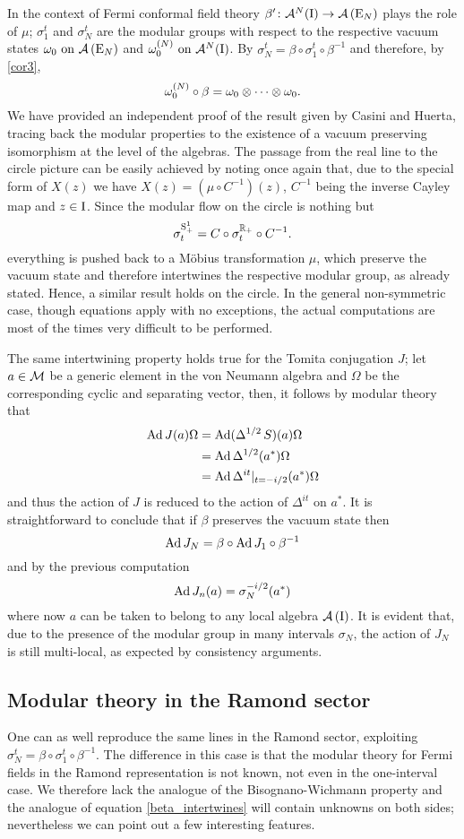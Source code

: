 In the context of Fermi conformal field theory 
$\beta'\colon\mathcal{A}^N(\textrm{I})\to \mathcal{A}\left(\textrm{E}_N\right)$ plays the role 
of $\mu$; $\sigma^t_1$ and $\sigma^t_N$ are the modular groups with 
respect to the respective vacuum states $\omega_0\text{ on }\mathcal{A}\left(\textrm{E}_N\right)$ 
and $\omega_0^{(N)}\text{ on } \mathcal{A}^N(\textrm{I})$.  By \cite*{CH:2009} 
$\sigma_N^t=\beta\circ\sigma^t_1\circ\beta^{-1}$ and therefore,
by \ref{cor3}, 
\[
\omega_0^{(N)}\circ\beta=\omega_0\otimes\cdots\otimes\omega_0.
\]
We have provided an independent proof of the result given 
by Casini and Huerta, tracing back the modular properties
to the existence of a vacuum preserving isomorphism at the 
level of the algebras. The passage from the real line to the 
circle picture can be easily achieved by noting once again 
that, due to the special form of $X(z)$ we have 
$X(z)=(\mu\circ C^{-1})(z)$, $C^{-1}$ being the inverse
Cayley map and $z\in\textrm{I}$. Since the modular flow on the circle is 
nothing but 
\[
\sigma_t^{\textrm{S}^1_+}=C\circ\sigma_t^{\mathbb{R}_+}\circ C^{-1}.
\]
everything is pushed back to a M\"obius transformation 
$\mu$, which preserve the vacuum state and therefore 
intertwines the respective modular group, as already stated. 
Hence, a similar result holds on the circle.
In the general non-symmetric case, though equations apply 
with no exceptions, the actual computations are most 
of the times very difficult to be performed.

\bigskip 
The same intertwining property holds true for the Tomita 
conjugation $J$; let $a\in\mathcal{M}$ be a generic element 
in the von Neumann algebra and $\Omega$ be the corresponding 
cyclic and separating vector, then, it follows by modular 
theory that
\begin{align*}
\operatorname{Ad} J(a)\Omega&=\operatorname{Ad} (\Delta^{1/2}\,S)(a)\Omega\\
&=\operatorname{Ad} \Delta^{1/2}(a^*)\Omega\\
&=\operatorname{Ad} \Delta^{it}|_{t=-i/2}(a^*)\Omega
\end{align*}
and thus the action of $J$ is reduced to the 
action of $\Delta^{it}$ on $a^*$. It is 
straightforward to conclude that if $\beta$
preserves the vacuum state then
\[
\operatorname{Ad} J_N=\beta\circ \operatorname{Ad} J_1\circ\beta^{-1}
\]
and by the previous computation
\[
\operatorname{Ad} J_n (a)=\sigma_N^{-i/2}(a^*)
\]
where now $a$ can be taken to belong to any 
local algebra $\mathcal{A}\left(\textrm{I}\right)$. It is evident that,
due to the presence of the modular group in
many intervals $\sigma_N$, the action of 
$J_N$ is still multi-local, as expected 
by consistency arguments.


\subsection{Modular theory in the Ramond sector}
One can as well reproduce the same lines in the Ramond
sector, exploiting $\sigma_N^t=\beta\circ
\sigma_1^t\circ\beta^{-1}$. The difference in this case 
is that the modular theory for Fermi fields in the Ramond 
representation is not known, not even in the one-interval 
case. We therefore lack the analogue of the Bisognano-Wichmann 
property and the analogue of equation \eqref{beta_intertwines}
will contain unknowns on both sides; nevertheless 
we can point out a few interesting features.

